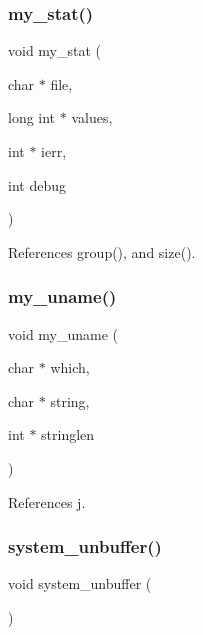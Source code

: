 \subsubsection{\texorpdfstring{my\+\_\+stat()}{my\_stat()}}
{\footnotesize\ttfamily void my\+\_\+stat (\begin{DoxyParamCaption}\item[{char $\ast$}]{file,  }\item[{long int $\ast$}]{values,  }\item[{int $\ast$}]{ierr,  }\item[{int}]{debug }\end{DoxyParamCaption})}



References group(), and size().

\mbox{\label{C-M__system_8c_ab341d42a9117c4bd188dcdcbff69fe9a}} 
\subsubsection{\texorpdfstring{my\+\_\+uname()}{my\_uname()}}
{\footnotesize\ttfamily void my\+\_\+uname (\begin{DoxyParamCaption}\item[{char $\ast$}]{which,  }\item[{char $\ast$}]{string,  }\item[{int $\ast$}]{stringlen }\end{DoxyParamCaption})}



References j.

\mbox{\label{C-M__system_8c_ab955d6c562df08b9e465fe3cea24d83d}} 
\subsubsection{\texorpdfstring{system\+\_\+unbuffer()}{system\_unbuffer()}}
{\footnotesize\ttfamily void system\+\_\+unbuffer (\begin{DoxyParamCaption}{ }\end{DoxyParamCaption})}



